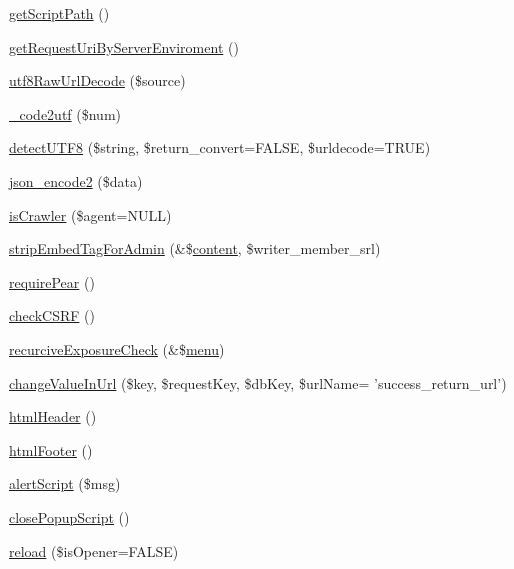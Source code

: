 \begin{DoxyCompactItemize}
\item 
\hyperlink{func_8inc_8php_a1086859329d03f8830d51d254c18e47e}{get\-Script\-Path} ()
\item 
\hyperlink{func_8inc_8php_a372c0e65e6e4778fc4e97b1fc3775463}{get\-Request\-Uri\-By\-Server\-Enviroment} ()
\item 
\hyperlink{func_8inc_8php_af1649820887f052ce1f1c9ca623f2db3}{utf8\-Raw\-Url\-Decode} (\$source)
\item 
\hyperlink{func_8inc_8php_a07446b33f4eda53315b12fc1c1b15f5a}{\-\_\-code2utf} (\$num)
\item 
\hyperlink{func_8inc_8php_a97f60adff3c4bbb5a341a557eef742b0}{detect\-U\-T\-F8} (\$string, \$return\-\_\-convert=F\-A\-L\-S\-E, \$urldecode=T\-R\-U\-E)
\item 
\hyperlink{func_8inc_8php_a3c49ddc63881e57fc5dd1aa4f923ef0c}{json\-\_\-encode2} (\$data)
\item 
\hyperlink{func_8inc_8php_a490ffbd4821da1995c76c381553d5b3d}{is\-Crawler} (\$agent=N\-U\-L\-L)
\item 
\hyperlink{func_8inc_8php_ad6d8ff5f851d62d39b170a46b766d834}{strip\-Embed\-Tag\-For\-Admin} (\&\$\hyperlink{classcontent}{content}, \$writer\-\_\-member\-\_\-srl)
\item 
\hyperlink{func_8inc_8php_ad09c8e07e96c499b4b71d54c2950e704}{require\-Pear} ()
\item 
\hyperlink{func_8inc_8php_a887fd7fe841f5dac3179296ae770172a}{check\-C\-S\-R\-F} ()
\item 
\hyperlink{func_8inc_8php_a229b3ea7ca966e907d266bc60efa353b}{recurcive\-Exposure\-Check} (\&\$\hyperlink{classmenu}{menu})
\item 
\hyperlink{func_8inc_8php_a2382c81f5a0708850f8790668edcaf90}{change\-Value\-In\-Url} (\$key, \$request\-Key, \$db\-Key, \$url\-Name= 'success\-\_\-return\-\_\-url')
\item 
\hyperlink{func_8inc_8php_adf603cdce37b515631c58bb3acffa614}{html\-Header} ()
\item 
\hyperlink{func_8inc_8php_a2f21eda8628bd378f56529cb680006b0}{html\-Footer} ()
\item 
\hyperlink{func_8inc_8php_acc16be2ad7371ac6478f2314f1248fe2}{alert\-Script} (\$msg)
\item 
\hyperlink{func_8inc_8php_a11562ea030a5d83564d0fbfcfabc8af9}{close\-Popup\-Script} ()
\item 
\hyperlink{func_8inc_8php_aaf78eccbde1406d602a7c408a364be24}{reload} (\$is\-Opener=F\-A\-L\-S\-E)
\end{DoxyCompactItemize}
